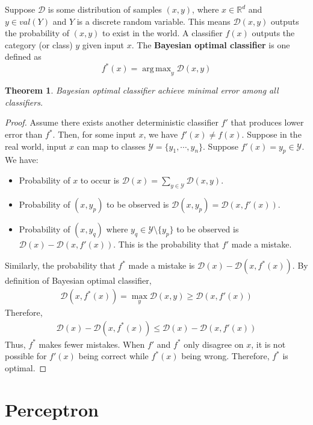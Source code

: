 \documentclass[12pt]{article}
\newtheorem{theorem}{Theorem}[section]
\theoremstyle{definition}
\DeclareMathOperator*{\argmax}{arg\,max}
\begin{document}
Suppose $\mathcal{D}$ is some distribution of samples $(x,y)$, where $x\in\mathbb{R}^d$ and $y\in val(Y)$ and $Y$ is a discrete random variable. This means $\mathcal{D}(x,y)$ outputs the probability of $(x,y)$ to exist in the world. A classifier $f(x)$ outputs the category (or class) $y$ given input $x$. The \textbf{Bayesian optimal classifier} is one defined as
\begin{equation}
  f^*(x)=\argmax_y\mathcal{D}(x,y)
\end{equation}
\begin{theorem}
  Bayesian optimal classifier achieve minimal error among all classifiers.
\end{theorem}
\begin{proof}
  Assume there exists another deterministic classifier $f'$ that produces lower error than $f^*$. Then, for some input $x$, we have $f'(x)\neq f(x)$. Suppose in the real world, input $x$ can map to classes $\mathcal{Y}=\{y_1,\cdots,y_n\}$. Suppose $f'(x)=y_p\in\mathcal{Y}$. We have:
  \begin{itemize}
  \item Probability of $x$ to occur is $\mathcal{D}(x)=\sum_{y\in\mathcal{Y}}\mathcal{D}(x,y)$.
  \item Probability of $(x,y_p)$ to be observed is $\mathcal{D}(x,y_p)=\mathcal{D}(x,f'(x))$.
  \item Probability of $(x,y_q)$ where $y_q\in\mathcal{Y}\setminus\{y_p\}$ to be observed is $\mathcal{D}(x)-\mathcal{D}(x,f'(x))$. This is the probability that $f'$ made a mistake.
  \end{itemize}
  Similarly, the probability that $f^*$ made a mistake is $\mathcal{D}(x)-\mathcal{D}(x,f^*(x))$. By definition of Bayesian optimal classifier,
  \begin{align}
    \mathcal{D}(x,f^*(x))=\max_y\mathcal{D}(x,y)\geq\mathcal{D}(x,f'(x))
  \end{align}
  Therefore,
  \begin{align}
    \mathcal{D}(x)-\mathcal{D}(x,f^*(x))\leq\mathcal{D}(x)-\mathcal{D}(x,f'(x))
  \end{align}
  Thus, $f^*$ makes fewer mistakes. When $f'$ and $f^*$ only disagree on $x$, it is not possible for $f'(x)$ being correct while $f^*(x)$ being wrong. Therefore, $f^*$ is optimal.
\end{proof}

\section{Perceptron}
\end{document}
